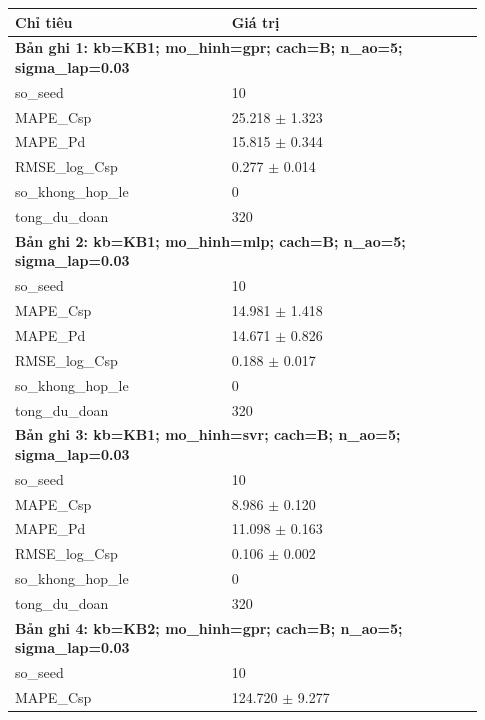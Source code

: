 % 
\begin{longtable}{p{0.43\linewidth}p{0.50\linewidth}}
\toprule Chỉ tiêu & Giá trị \\ \midrule \endhead
\multicolumn{2}{p{0.95\linewidth}}{\textbf{Bản ghi 1: kb=KB1; mo\_hinh=gpr; cach=B; n\_ao=5; sigma\_lap=0.03}} \\
so\_\allowbreak seed & 10 \\
MAPE\_\allowbreak Csp & 25.218 $\pm$ 1.323 \\
MAPE\_\allowbreak Pd & 15.815 $\pm$ 0.344 \\
RMSE\_\allowbreak log\_\allowbreak Csp & 0.277 $\pm$ 0.014 \\
so\_\allowbreak khong\_\allowbreak hop\_\allowbreak le & 0 \\
tong\_\allowbreak du\_\allowbreak doan & 320 \\
\midrule
\multicolumn{2}{p{0.95\linewidth}}{\textbf{Bản ghi 2: kb=KB1; mo\_hinh=mlp; cach=B; n\_ao=5; sigma\_lap=0.03}} \\
so\_\allowbreak seed & 10 \\
MAPE\_\allowbreak Csp & 14.981 $\pm$ 1.418 \\
MAPE\_\allowbreak Pd & 14.671 $\pm$ 0.826 \\
RMSE\_\allowbreak log\_\allowbreak Csp & 0.188 $\pm$ 0.017 \\
so\_\allowbreak khong\_\allowbreak hop\_\allowbreak le & 0 \\
tong\_\allowbreak du\_\allowbreak doan & 320 \\
\midrule
\multicolumn{2}{p{0.95\linewidth}}{\textbf{Bản ghi 3: kb=KB1; mo\_hinh=svr; cach=B; n\_ao=5; sigma\_lap=0.03}} \\
so\_\allowbreak seed & 10 \\
MAPE\_\allowbreak Csp & 8.986 $\pm$ 0.120 \\
MAPE\_\allowbreak Pd & 11.098 $\pm$ 0.163 \\
RMSE\_\allowbreak log\_\allowbreak Csp & 0.106 $\pm$ 0.002 \\
so\_\allowbreak khong\_\allowbreak hop\_\allowbreak le & 0 \\
tong\_\allowbreak du\_\allowbreak doan & 320 \\
\midrule
\multicolumn{2}{p{0.95\linewidth}}{\textbf{Bản ghi 4: kb=KB2; mo\_hinh=gpr; cach=B; n\_ao=5; sigma\_lap=0.03}} \\
so\_\allowbreak seed & 10 \\
MAPE\_\allowbreak Csp & 124.720 $\pm$ 9.277 \\

\end{longtable}
